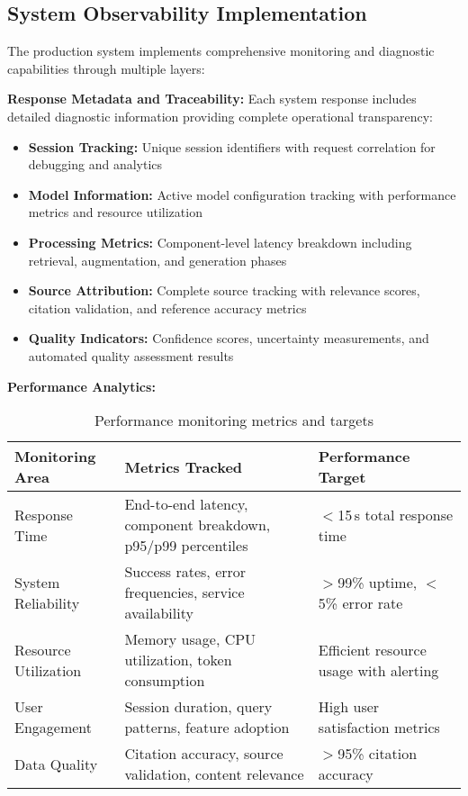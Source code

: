 \subsection{System Observability Implementation}
\label{subsec:observability_s3}

The production system implements comprehensive monitoring and diagnostic capabilities through multiple layers:

\textbf{Response Metadata and Traceability:}
Each system response includes detailed diagnostic information providing complete operational transparency:

\begin{itemize}
    \item \textbf{Session Tracking:} Unique session identifiers with request correlation for debugging and analytics
    \item \textbf{Model Information:} Active model configuration tracking with performance metrics and resource utilization
    \item \textbf{Processing Metrics:} Component-level latency breakdown including retrieval, augmentation, and generation phases
    \item \textbf{Source Attribution:} Complete source tracking with relevance scores, citation validation, and reference accuracy metrics
    \item \textbf{Quality Indicators:} Confidence scores, uncertainty measurements, and automated quality assessment results
\end{itemize}

\textbf{Performance Analytics:}
\begin{table}[H]
\centering
\caption{Performance monitoring metrics and targets}
\label{tab:performance_monitoring_s3}
\begin{tabular}{|p{4cm}|p{6cm}|p{4cm}|}
\hline
\textbf{Monitoring Area} & \textbf{Metrics Tracked} & \textbf{Performance Target} \\
\hline
Response Time & End-to-end latency, component breakdown, p95/p99 percentiles & $<$15\,s total response time \\
\hline
System Reliability & Success rates, error frequencies, service availability & $>$99\% uptime, $<$5\% error rate \\
\hline
Resource Utilization & Memory usage, CPU utilization, token consumption & Efficient resource usage with alerting \\
\hline
User Engagement & Session duration, query patterns, feature adoption & High user satisfaction metrics \\
\hline
Data Quality & Citation accuracy, source validation, content relevance & $>$95\% citation accuracy \\
\hline
\end{tabular}
\end{table}

